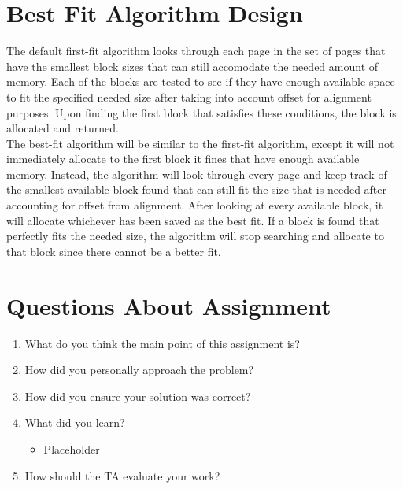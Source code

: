 \documentclass[onecolumn,draftclsnofoot, 10pt, compsoc]{IEEEtran}
\begin{document}
\clearpage
\section{Best Fit Algorithm Design}
	The default first-fit algorithm looks through each page in the set of pages that have the smallest block sizes that can still accomodate the needed amount of memory.
	Each of the blocks are tested to see if they have enough available space to fit the specified needed size after taking into account offset for alignment purposes.
	Upon finding the first block that satisfies these conditions, the block is allocated and returned. \\

	The best-fit algorithm will be similar to the first-fit algorithm, except it will not immediately allocate to the first block it fines that have enough available memory.
	Instead, the algorithm will look through every page and keep track of the smallest available block found that can still fit the size that is needed after accounting for offset from alignment.
	After looking at every available block, it will allocate whichever has been saved as the best fit.
	If a block is found that perfectly fits the needed size, the algorithm will stop searching and allocate to that block since there cannot be a better fit.

\section{Questions About Assignment}
	\begin{enumerate}
		\item What do you think the main point of this assignment is? \\

		\item How did you personally approach the problem? \\

		\item How did you ensure your solution was correct? \\

		\item What did you learn? \\
			\begin{itemize}
				\item Placeholder
			\end{itemize}

		\item How should the TA evaluate your work? \\

	\end{enumerate}
\end{document}
